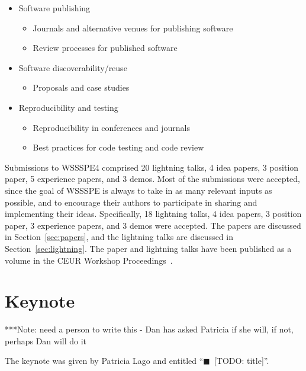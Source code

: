 \documentclass[11pt, oneside]{amsart}
\newcommand{\todo}[1]{{\color{blue}$\blacksquare$~\textsf{[TODO: #1]}}}
\newcommand{\note}[1]{ {\textcolor{blueish}    { ***Note:      #1 }}}
\begin{document}
\begin{itemize}
\item Software publishing
\begin{itemize}
    \item Journals and alternative venues for publishing software
    \item Review processes for published software
\end{itemize}

\item Software discoverability/reuse
\begin{itemize}
    \item Proposals and case studies
\end{itemize}

\item Reproducibility and testing
\begin{itemize}
    \item Reproducibility in conferences and journals
    \item Best practices for code testing and code review
\end{itemize}

\end{itemize}

Submissions to WSSSPE4 comprised
20 lightning talks,
4 idea papers,
3 position paper,
5 experience papers,
and
3 demos.
Most of the submissions were accepted, since the goal of WSSSPE is always to
take in as many relevant inputs as possible, and to encourage their authors to
participate in sharing and implementing their ideas.
Specifically,
18 lightning talks,
4 idea papers,
3 position paper,
3 experience papers,
and
3 demos
were accepted.
The papers are discussed in Section~\ref{sec:papers},
and the lightning talks are discussed in Section~\ref{sec:lightning}.
The paper and lightning talks have been published as a volume in the CEUR Workshop Proceedings~\cite{WSSSPE4-proceedings}.

\section{Keynote}\label{sec:keynote}

\note{need a person to write this - Dan has asked Patricia if she will, if not, perhaps Dan will do it}

The keynote was given by Patricia Lago and entitled ``\todo{title}''.

\end{document}
